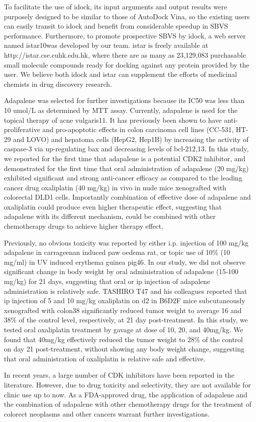 To facilitate the use of idock, its input arguments and output results were purposely designed to be similar to those of AutoDock Vina, so the existing users can easily transit to idock and benefit from considerable speedup in SBVS performance. Furthermore, to promote prospective SBVS by idock, a web server named istar10was developed by our team. istar is freely available at http://istar.cse.cuhk.edu.hk, where there are as many as 23,129,083 purchasable small molecule compounds ready for docking against any protein provided by the user. We believe both idock\citep{1153} and istar \citep{1362} can supplement the efforts of medicinal chemists in drug discovery research.

Adapalene was selected for further investigations because its IC50 was less than 10 umol/L as determined by MTT assay. Currently, adapalene is used for the topical therapy of acne vulgaris11. It has previously been shown to have anti-proliferative and pro-apoptotic effects in colon carcinoma cell lines (CC-531, HT-29 and LOVO) and hepatoma cells (HepG2, Hep1B) by increasing the activity of caspase-3 via up-regulating bax and decreasing levels of bcl-212,13. In this study, we reported for the first time that adapalene is a potential CDK2 inhibitor, and demonstrated for the first time that oral administration of adapalene (20 mg/kg) exhibited significant and strong anti-cancer efficacy as compared to the leading cancer drug oxaliplatin (40 mg/kg) in vivo in nude mice xenografted with colorectal DLD1 cells. Importantly combination of effective dose of adapalene and oxaliplatin could produce even higher therapeutic effect, suggesting that adapalene with its different mechanism, could be combined with other chemotherapy drugs to achieve higher therapy effect.

Previously, no obvious toxicity was reported by either i.p. injection of 100 mg/kg adapalene in carrageenan induced paw oedema rat, or topic use of 10\% (10 mg/ml) in UV induced erythema guinea pig46. In our study, we did not observe significant change in body weight by oral administration of adapalene (15-100 mg/kg) for 21 days, suggesting that oral or ip injection of adapalene administration is relatively safe. TASHIRO T47 and his colleagues reported that ip injection of 5 and 10 mg/kg oxaliplatin on d2 in B6D2F mice subcutaneously xenografted with colon38 significantly reduced tumor weight to average 16 and 38\% of the control level, respectively, at 21 day post-treatment. In this study, we tested oral oxaliplatin treatment by gavage at dose of 10, 20, and 40mg/kg. We found that 40mg/kg effectively reduced the tumor weight to 28\% of the control on day 21 post-treatment, without showing any body weight change, suggesting that oral administration of oxaliplatin is relative safe and effective.

In recent years, a large number of CDK inhibitors have been reported in the literature. However, due to drug toxicity and selectivity, they are not available for clinic use up to now. As a FDA-approved drug, the application of adapalene and the combination of adapalene with other chemotherapy drugs for the treatment of colorect neoplasms and other cancers warrant further investigations.

\chapterend
